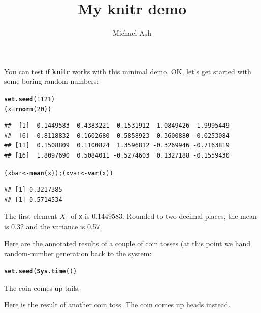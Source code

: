 \documentclass{article}\usepackage[]{graphicx}\usepackage[]{color}
\makeatletter
\newcommand{\hlnum}[1]{\textcolor[rgb]{0.686,0.059,0.569}{#1}}%
\newcommand{\hlstd}[1]{\textcolor[rgb]{0.345,0.345,0.345}{#1}}%
\newcommand{\hlkwb}[1]{\textcolor[rgb]{0.69,0.353,0.396}{#1}}%
\newcommand{\hlkwd}[1]{\textcolor[rgb]{0.737,0.353,0.396}{\textbf{#1}}}%
\newenvironment{kframe}{%
 \def\at@end@of@kframe{}%
 \ifinner\ifhmode%
  \def\at@end@of@kframe{\end{minipage}}%
  \begin{minipage}{\columnwidth}%
 \fi\fi%
 \def\FrameCommand##1{\hskip\@totalleftmargin \hskip-\fboxsep
 \colorbox{shadecolor}{##1}\hskip-\fboxsep
     \hskip-\linewidth \hskip-\@totalleftmargin \hskip\columnwidth}%
 \MakeFramed {\advance\hsize-\width
   \@totalleftmargin\z@ \linewidth\hsize
   \@setminipage}}%
 {\par\unskip\endMakeFramed%
 \at@end@of@kframe}
\newenvironment{knitrout}{}{} %
\makeatother
\begin{document}
\title{My knitr demo}
\author{Michael Ash}
\maketitle

You can test if \textbf{knitr} works with this minimal demo. OK, let's
get started with some boring random numbers:

\begin{knitrout}
\color{fgcolor}\begin{kframe}
\begin{alltt}
\hlkwd{set.seed}\hlstd{(}\hlnum{1121}\hlstd{)}
\hlstd{(x}\hlkwb{=}\hlkwd{rnorm}\hlstd{(}\hlnum{20}\hlstd{))}
\end{alltt}
\begin{verbatim}
##  [1]  0.1449583  0.4383221  0.1531912  1.0849426  1.9995449
##  [6] -0.8118832  0.1602680  0.5858923  0.3600880 -0.0253084
## [11]  0.1508809  0.1100824  1.3596812 -0.3269946 -0.7163819
## [16]  1.8097690  0.5084011 -0.5274603  0.1327188 -0.1559430
\end{verbatim}
\begin{alltt}
\hlstd{(xbar}  \hlkwb{<-} \hlkwd{mean}\hlstd{(x)); (xvar}  \hlkwb{<-} \hlkwd{var}\hlstd{(x))}
\end{alltt}
\begin{verbatim}
## [1] 0.3217385
## [1] 0.5714534
\end{verbatim}
\end{kframe}
\end{knitrout}

The first element $X_1$ of \texttt{x} is 0.1449583. Rounded to two decimal places, the mean is 0.32 and the variance is 0.57.

Here are the annotated results of a couple of coin tosses (at this
point we hand random-number generation back to the system:
\begin{knitrout}
\color{fgcolor}\begin{kframe}
\begin{alltt}
\hlkwd{set.seed}\hlstd{(}\hlkwd{Sys.time}\hlstd{())}
\end{alltt}
\end{kframe}
\end{knitrout}



The coin comes up tails.



Here is the result of another coin toss.  The coin comes up heads instead.
\end{document}
